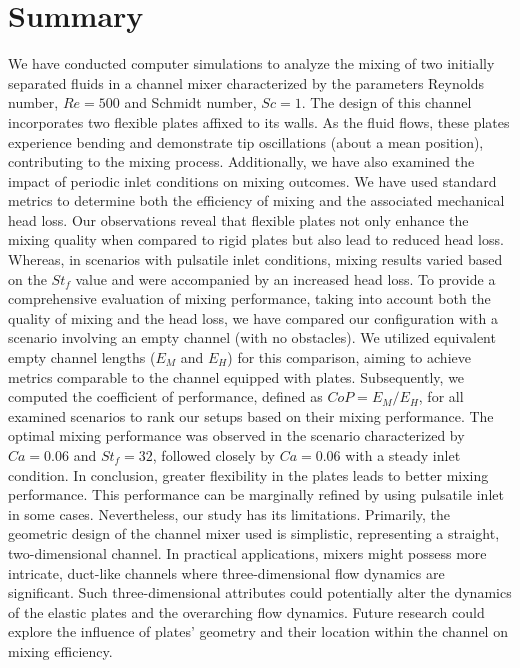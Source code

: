 \documentclass[%
 aip,
 amsmath,amssymb,
 reprint,
]{revtex4-1}
\begin{document}
\section{Summary}
We have conducted computer simulations to analyze the mixing of two initially separated fluids in a channel mixer characterized by the parameters Reynolds number, $Re=500$ and Schmidt number, $Sc=1$. The design of this channel incorporates two flexible plates affixed to its walls. As the fluid flows, these plates experience bending and demonstrate tip oscillations (about a mean position), contributing to the mixing process. Additionally, we have also examined the impact of periodic inlet conditions on mixing outcomes. We have used standard metrics to determine both the efficiency of mixing and the associated mechanical head loss. Our observations reveal that flexible plates not only enhance the mixing quality when compared to rigid plates but also lead to reduced head loss. Whereas, in scenarios with pulsatile inlet conditions, mixing results varied based on the $St_f$ value and were accompanied by an increased head loss. To provide a comprehensive evaluation of mixing performance, taking into account both the quality of mixing and the head loss, we have compared our configuration with a scenario involving an empty channel (with no obstacles). We utilized equivalent empty channel lengths ($E_M$ and $E_H$) for this comparison, aiming to achieve metrics comparable to the channel equipped with plates. Subsequently, we computed the coefficient of performance, defined as $CoP=E_M/E_H$, for all examined scenarios to rank our setups based on their mixing performance. The optimal mixing performance was observed in the scenario characterized by $Ca=0.06$ and $St_f=32$, followed closely by $Ca=0.06$ with a steady inlet condition. In conclusion, greater flexibility in the plates leads to better mixing performance. This performance can be marginally refined by using pulsatile inlet in some cases.
Nevertheless, our study has its limitations. Primarily, the geometric design of the channel mixer used is simplistic, representing a straight, two-dimensional channel. In practical applications, mixers might possess more intricate, duct-like channels where three-dimensional flow dynamics are significant. Such three-dimensional attributes could potentially alter the dynamics of the elastic plates and the overarching flow dynamics. Future research could explore the influence of plates' geometry and their location within the channel on mixing efficiency.
\end{document}
